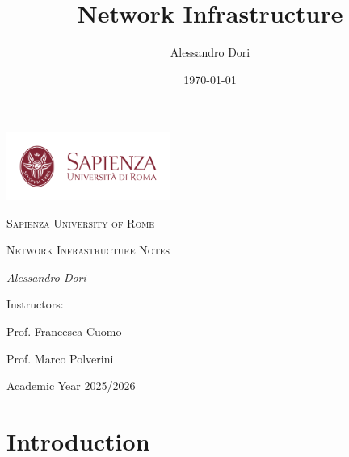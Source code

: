 \documentclass{article}
\title{Network Infrastructure}
\author{Alessandro Dori}
\date{\today}
\begin{document}
\begin{titlepage}
    \centering
        \vspace*{1in}
        
        \includegraphics[width=0.4\textwidth]{Immagini/logo-sapienza.png}\par\vspace{1cm}
        
        {\scshape\LARGE Sapienza University of Rome \par}
        \vspace{1.5cm}

         {\scshape\Large Network Infrastructure Notes\par}
        \vspace{1.5cm}
        
        {\Large\itshape Alessandro Dori\par}
        
        \vspace{3cm}
        
        Instructors:\par
        {\large Prof. Francesca Cuomo\par}
        {\large Prof. Marco Polverini\par}
        
        \vfill
        
        {\large Academic Year 2025/2026\par}
    
\end{titlepage}


\maketitle
\tableofcontents
\newpage


\section{Introduction}
\end{document}
